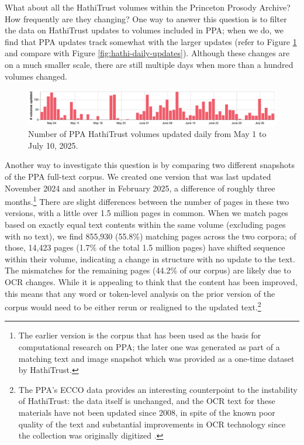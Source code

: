 \documentclass[final]{anthology-ch} %
\begin{document}
What about all the HathiTrust volumes within the Princeton Prosody Archive? How frequently are they changing? One way to answer this question is to filter the data on HathiTrust updates to volumes included in PPA; when we do, we find that PPA updates track somewhat with the larger updates (refer to Figure \ref{fig:ppa-daily-updates} and compare with Figure \ref{fig:hathi-daily-updates}). Although these changes are on a much smaller scale, there are still multiple days when more than a hundred volumes changed.

\begin{figure}[t!]
    \centering
    \includegraphics[width=1\linewidth]{images/ppa_hathitrust_changes_countonly.pdf}
    \caption{Number of PPA HathiTrust volumes updated daily from May 1 to July 10, 2025.}
    \label{fig:ppa-daily-updates}
\end{figure}

Another way to investigate this question is by comparing two different snapshots of the PPA full-text corpus. We created one version that was last updated November 2024 and another in February 2025, a difference of roughly three months.\footnote{The earlier version is the corpus that has been used as the basis for computational research on PPA; the later one was generated as part of a matching text and image snapshot which was provided as a one-time dataset by HathiTrust.} There are slight differences between the number of pages in these two versions, with a little over 1.5 million pages in common. When we match pages based on exactly equal text contents within the same volume (excluding pages with no text), we find 855,930 (55.8\%) matching pages across the two corpora; of those, 14,423 pages (1.7\% of the total 1.5 million pages) have shifted sequence within their volume, indicating a change in structure with no update to the text. The mismatches for the remaining pages (44.2\% of our corpus) are likely due to OCR changes. While it is appealing to think that the content has been improved, this means that any word or token-level analysis on the prior version of the corpus would need to be either rerun or realigned to the updated text.\footnote{The PPA's ECCO data provides an interesting counterpoint to the instability of HathiTrust: the data itself is unchanged, and the OCR text for these materials have not been updated since 2008, in spite of the known poor quality of the text and substantial improvements in OCR technology since the collection was originally digitized \cite{hill_quantifying_2019}.}
\end{document}
